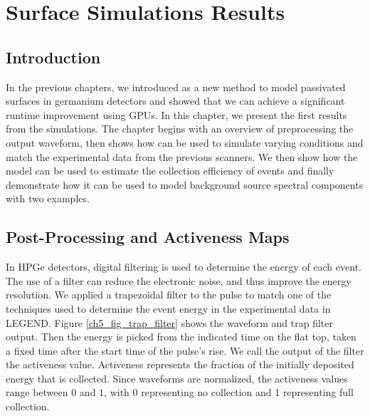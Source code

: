 \chapter{Surface Simulations Results}
\label{chap:ehd_res}

\section{Introduction}
In the previous chapters, we introduced {\ehd} as a new method to model passivated surfaces in germanium detectors and showed that we can achieve a significant runtime improvement using GPUs. In this chapter, we present the first results from the simulations. The chapter begins with an overview of preprocessing the output waveform, then shows how {\ehd} can be used to simulate varying conditions and match the experimental data from the previous scanners. We then show how the model can be used to estimate the collection efficiency of {\onbb} events and finally demonstrate how it can be used to model background source spectral components with two examples.

\section{Post-Processing and Activeness Maps}
In HPGe detectors, digital filtering is used to determine the energy of each event. The use of a filter can reduce the electronic noise, and thus improve the energy resolution. We applied a trapezoidal filter to the pulse to match one of the techniques used to determine the event energy in the experimental data in LEGEND. Figure \ref{ch5_fig_trap_filter} shows the waveform and trap filter output. Then the energy is picked from the indicated time on the flat top, taken a fixed time after the start time of the pulse's rise. We call the output of the filter the activeness value. Activeness represents the fraction of the initially deposited energy that is collected. Since {\ehd} waveforms are normalized, the activeness values range between $0$ and $1$, with $0$ representing no collection and 1 representing full collection. 

